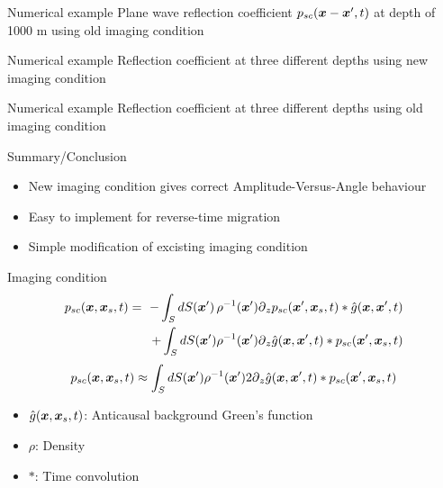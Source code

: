 \documentclass[xcolor=dvipsnames]{beamer}
\begin{document}
\begin{frame}{Numerical example}
Plane wave reflection coefficient  $p_{sc}(\mbox{\boldmath $x$}-\mbox{\boldmath $x$}',t)$ at depth of 1000 m
using old imaging condition
%
\begin{figure}
\end{figure}
\end{frame}
\begin{frame}{Numerical example}
Reflection coefficient at three different depths
using new imaging condition
%
\begin{figure}
\end{figure}
\end{frame}
\begin{frame}{Numerical example}
%
Reflection coefficient at three different depths
using old imaging condition
\begin{figure}
\end{figure}
\end{frame}
\begin{frame}{Summary/Conclusion}
%
\begin{itemize}
  \item New imaging condition gives correct Amplitude-Versus-Angle behaviour
  \item Easy to implement for reverse-time migration
  \item Simple modification of excisting imaging condition
\end{itemize}
\end{frame}
\begin{frame}{Imaging condition}
%
\begin{eqnarray}
  p_{sc}(\mbox{\boldmath $x$},\mbox{\boldmath $x$}_s,t)=\
    -\int_S dS(\mbox{\boldmath $x$}') \,  \rho^{-1}(\mbox{\boldmath $x$}')\mbox{$\partial$}_z p_{sc}(\mbox{\boldmath $x$}',\mbox{\boldmath $x$}_s,t)*\hat{g}(\mbox{\boldmath $x$},\mbox{\boldmath $x$}',t) \nonumber\\
   + \int_S dS(\mbox{\boldmath $x$}') \rho^{-1}(\mbox{\boldmath $x$}')\mbox{$\partial$}_z \hat{g}(\mbox{\boldmath $x$},\mbox{\boldmath $x$}',t)*p_{sc}(\mbox{\boldmath $x$}',\mbox{\boldmath $x$}_s,t) 
\end{eqnarray}
%
%
\begin{eqnarray}
  p_{sc}(\mbox{\boldmath $x$},\mbox{\boldmath $x$}_s,t)\approx
    \int_S dS(\mbox{\boldmath $x$}') \rho^{-1}(\mbox{\boldmath $x$}')2\mbox{$\partial$}_z \hat{g}(\mbox{\boldmath $x$},\mbox{\boldmath $x$}',t)*p_{sc}(\mbox{\boldmath $x$}',\mbox{\boldmath $x$}_s,t) 
\end{eqnarray}
%
\begin{itemize}
  \item $\hat{g}(\mbox{\boldmath $x$},\mbox{\boldmath $x$}_s,t)$: Anticausal background Green's function
  \item $\rho$: Density
  \item $*$: Time convolution
\end{itemize}
\end{frame}
\end{document}
